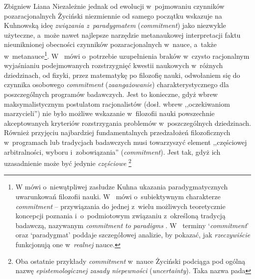 \begin{artplenv}{Zbigniew Liana}
Niezależnie jednak od ewolucji w~pojmowaniu czynników pozaracjonalnych Życiński niezmiennie od samego początku wskazuje
na Kuhnowską ideę \textit{związania z~paradygmatem }(\textit{commitment}) jako niezwykle użyteczne, a~może nawet najlepsze
narzędzie metanaukowej interpretacji faktu nieuniknionej obecności czynników
pozaracjonalnych w~nauce, a~także w~metanauce\footnote{W
\parencite[s.~153]{zycinski_jezyk_1983}
mówi o~niewątpliwej
zasłudze Kuhna ukazania paradygmatycznych uwarunkowań filozofii nauki.
W~\parencite[s.~160]{zycinski_teizm_1985}
mówi o~subiektywnym charakterze \textit{commitment} -- przywiązania do jednej z~wielu możliwych
teoretycznie koncepcji poznania i~o~podmiotowym związaniu z~określoną tradycją badawczą, nazywanym \textit{commitment to
paradigms}
\parencite*[s.~164]{zycinski_teizm_1985}.
W~\parencite[s.~191–200]{zycinski_elementy_1996}
terminy `\textit{commitment}' oraz `paradygmat' poddaje szczegółowej analizie, by pokazać, jak
\textit{rzeczywiście} funkcjonują one w~\textit{realnej} nauce.}.
W~\parencites[s.~136n]{zycinski_structure_1988}[s.~241n]{zycinski_struktura_2013}
mówi o~potrzebie uzupełnienia braków w~czysto racjonalnym wyjaśnianiu
podejmowanych rozstrzygnięć kwestii naukowych w~różnych dziedzinach, od fizyki, przez matematykę po filozofię nauki,
odwołaniem się do czynnika osobowego \textit{commitment} (\textit{zaangażowanie}) charakterystycznego dla poszczególnych
programów badawczych. Jest to konieczne, gdyż wbrew maksymalistycznym postulatom racjonalistów (dosł. wbrew
,,oczekiwaniom marzycieli'') nie było możliwe wskazanie w~filozofii nauki powszechnie akceptowanych kryteriów
rozstrzygania problemów w~poszczególnych dziedzinach. Również przyjęciu najbardziej fundamentalnych przedzałożeń
filozoficznych w~programach lub tradycjach badawczych musi towarzyszyć element ,,częściowej arbitralności,
wyboru i~zobowiązania'' (\textit{commitment}).
Jest tak, gdyż ich uzasadnienie może być jedynie \textit{częściowe}
\parencites[zob.][s.~143]{zycinski_structure_1988}[s.~253n]{zycinski_struktura_2013}\footnote{\label{lia-foo-51rev}Oba
ostatnie przykłady \textit{commitment} w~nauce
Życiński podciąga pod ogólną nazwę \textit{epistemologicznej zasady niepewności} (\textit{uncertainty}). Taka nazwa pada
}
\end{artplenv}
